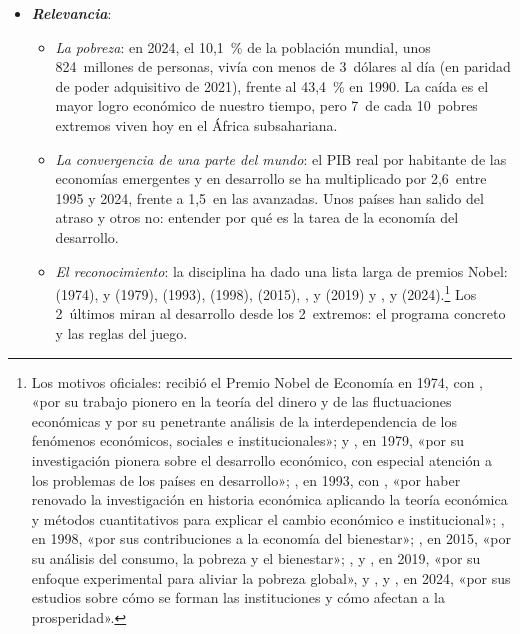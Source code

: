 \documentclass[11pt]{article}
\begin{document}
\begin{itemize}
\item \textbf{\emph{Relevancia}}:
  \begin{itemize}
  \item \emph{La pobreza}: en 2024, el 10,1~\% de la población mundial, unos 824~millones de personas, vivía con menos de 3~dólares al día (en paridad de poder adquisitivo de 2021), frente al 43,4~\% en 1990\nocite{BM2026PobrezaSept,BM2026PIP}. La caída es el mayor logro económico de nuestro tiempo, pero 7~de cada 10~pobres extremos viven hoy en el África subsahariana.
  \item \emph{La convergencia de una parte del mundo}: el PIB real por habitante de las economías emergentes y en desarrollo se ha multiplicado por 2,6~entre 1995 y 2024, frente a 1,5~en las avanzadas\nocite{FMI2026WEOdatos}. Unos países han salido del atraso y otros no: entender por qué es la tarea de la economía del desarrollo.
  \item \emph{El reconocimiento}: la disciplina ha dado una lista larga de premios Nobel:  (1974),  y  (1979),  (1993),  (1998),  (2015), ,  y  (2019) y ,  y  (2024).\footnote{Los motivos oficiales:  recibió el Premio Nobel de Economía en 1974, con , «por su trabajo pionero en la teoría del dinero y de las fluctuaciones económicas y por su penetrante análisis de la interdependencia de los fenómenos económicos, sociales e institucionales»\nocite{NobelPrize1974};  y , en 1979, «por su investigación pionera sobre el desarrollo económico, con especial atención a los problemas de los países en desarrollo»\nocite{NobelPrize1979}; , en 1993, con , «por haber renovado la investigación en historia económica aplicando la teoría económica y métodos cuantitativos para explicar el cambio económico e institucional»\nocite{NobelPrize1993North}; , en 1998, «por sus contribuciones a la economía del bienestar»\nocite{NobelPrize1998}; , en 2015, «por su análisis del consumo, la pobreza y el bienestar»\nocite{NobelPrize2015}; ,  y , en 2019, «por su enfoque experimental para aliviar la pobreza global»\nocite{NobelPrize2019}, y ,  y , en 2024, «por sus estudios sobre cómo se forman las instituciones y cómo afectan a la prosperidad»\nocite{NobelPrize2024}.} Los 2~últimos miran al desarrollo desde los 2~extremos: el programa concreto y las reglas del juego.
  \end{itemize}


\end{itemize}
\end{document}

